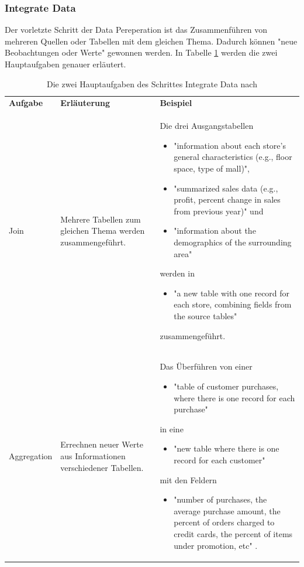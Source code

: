 \subsubsection{Integrate Data}
Der vorletzte Schritt der Data Pereperation ist das Zusammenführen von mehreren Quellen oder Tabellen mit dem gleichen Thema. Dadurch können "neue Beobachtungen oder Werte"\citep[S.~22]{chapman_crisp-dm_2000} gewonnen werden. In Tabelle \ref{tab:integrateDataO} werden die zwei Hauptaufgaben\citep[S.~17]{shearer_crisp-dm_2000} genauer erläutert.
\begin{table}[H] \centering
\begin{tabular}{|p{2cm}|p{3.5cm}|p{10cm}|}
\hline
\textbf{Aufgabe} & \textbf{Erläuterung} & \textbf{Beispiel}\\
\hhline{===}
Join & Mehrere Tabellen zum gleichen Thema werden zusammengeführt. & Die drei Ausgangstabellen
\begin{itemize}
\item "information about each store’s general characteristics (e.g., floor space, type of mall)",
\item "summarized sales data (e.g., profit, percent change in sales from previous year)" und
\item "information about the demographics of the surrounding area"
\end{itemize}
werden in 
\begin{itemize}
\item "a new table with one record for each store, combining fields from the source tables"\citep[S.~16]{shearer_crisp-dm_2000}
\end{itemize}
zusammengeführt. \\ \hline
Aggregation &  Errechnen neuer Werte aus Informationen verschiedener Tabellen. & Das Überführen von einer
\begin{itemize}
\item "table of customer purchases, where there is one record for each purchase"
\end{itemize}
in eine 
\begin{itemize}
\item "new table where there is one record for each customer"
\end{itemize}
mit den Feldern 
\begin{itemize}
\item "number of purchases, the average purchase amount, the percent of orders charged to credit cards, the
percent of items under promotion, etc" \citep[S.~17]{shearer_crisp-dm_2000}.
\end{itemize}
\\
   \hline
\end{tabular}
\caption{Die zwei Hauptaufgaben des Schrittes Integrate Data nach \citep[S.~17]{shearer_crisp-dm_2000}}
\label{tab:integrateDataO}
\end{table}


